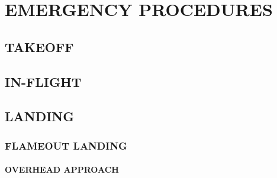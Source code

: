 \chapter{EMERGENCY PROCEDURES}
\localtableofcontents
\thispagestyle{plain}
\cleardoublepage

\marginfigeometry

\section{TAKEOFF}

\section{IN-FLIGHT}

\clearpage

\section{LANDING}

\marginfigrestore

\subsection{FLAMEOUT LANDING}

\subsubsection{OVERHEAD APPROACH}

